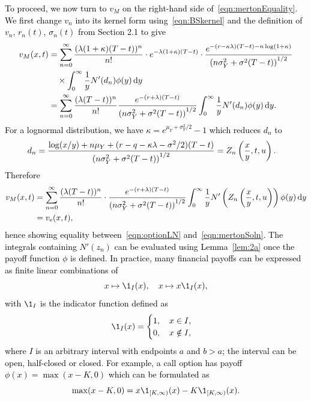 \textcolor{black}{
To proceed, we now turn to $v_M$ on the right-hand side of~\eqref{eqn:mertonEquality}. We first change $v_n$ into its kernel form using~\eqref{eqn:BSkernel} and the definition of $v_n$, $r_n(t)$, $\sigma_n(t)$ from Section 2.1 to give
	\begin{align*}
		v_M(x,t) &=  \displaystyle\sum\limits_{n=0}^\infty\frac{(\lambda(1+\kappa)(T-t))^n}{n!}\cdot e^{-\lambda(1+\kappa)(T-t)}\cdot \frac{e^{-(r-\kappa\lambda)(T-t)-n\log(1+\kappa)}}{\left(n\sigma_Y^2 + \sigma^2(T-t)\right)^{1/2}} \\
		& \quad {} \times \int_0^\infty \frac{1}{y}N'(d_n) \phi(y) \, \mathrm d y \\
		&= \displaystyle\sum\limits_{n=0}^\infty\frac{(\lambda(T-t))^n}{n!}\frac{e^{-(r+\lambda)(T-t)}}{\left(n\sigma_Y^2 + \sigma^2(T-t)\right)^{1/2}}\int_0^\infty \frac{1}{y}N'(d_n) \phi(y) \, \mathrm d y.
	\end{align*}
For a lognormal distribution, we have $\kappa = e^{\mu_Y + \sigma_Y^2/2} - 1$ which reduces $d_n$ to
	\begin{align*}
		d_n &= \frac{\log(x/y) + n\mu_Y + (r - q - \kappa\lambda - \sigma^2/2)(T-t)}{\left( n\sigma_Y^2 + \sigma^2(T-t) \right)^{1/2}} = Z_n\left(\frac{x}{y},t,u\right).
	\end{align*}
Therefore
	\begin{align*}
		v_M(x,t) &=  \displaystyle\sum\limits_{n=0}^\infty\frac{(\lambda(T-t))^n}{n!}\cdot\frac{e^{-(r+\lambda)(T-t)}}{\left(n\sigma_Y^2 + \sigma^2(T-t)\right)^{1/2}}\int_0^\infty \frac{1}{y}N'\left(Z_n\left( \frac{x}{y},t,u \right)\right) \phi(y) \, \mathrm d y \\
		 &= v_\text{e}(x,t),
	\end{align*}
hence showing equality between~\eqref{eqn:optionLN} and~\eqref{eqn:mertonSoln}. The integrals containing $N'(z_n)$ can be evaluated using Lemma~\ref{lem:2a} once the payoff function $\phi$ is defined. In practice, \textcolor{black}{many} financial payoffs can be expressed as finite linear combinations of
	$$
		x \mapsto \1_{I}(x), \quad x \mapsto x\1_{I}(x),
	$$
with $\1_I$ is the indicator function defined as
	$$
		\1_I(x) = \begin{cases}
			1, \quad x \in I, \\
			0, \quad x \notin I,
		\end{cases}
	$$
\textcolor{black}{where $I$ is an arbitrary interval with endpoints $a$ and $b > a$; the interval can be open, half-closed or closed.} For example, a call option has payoff $\phi(x) = \max(x-K,0)$ which can be formulated as
	$$
		\max(x-K,0) = x\1_{[K,\infty)}(x) - K\1_{[K,\infty)}(x).
$$}
